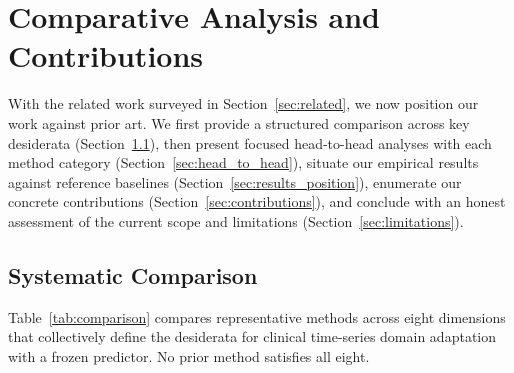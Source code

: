 
\section{Comparative Analysis and Contributions}
\label{sec:comparison}

With the related work surveyed in Section~\ref{sec:related}, we now
position our work against prior art.
We first provide a structured comparison across key desiderata
(Section~\ref{sec:comparison_table}), then present focused head-to-head analyses
with each method category (Section~\ref{sec:head_to_head}), situate our
empirical results against reference baselines (Section~\ref{sec:results_position}),
enumerate our concrete contributions (Section~\ref{sec:contributions}),
and conclude with an honest assessment of the current scope and limitations
(Section~\ref{sec:limitations}).


\subsection{Systematic Comparison}
\label{sec:comparison_table}

Table~\ref{tab:comparison} compares representative methods across eight
dimensions that collectively define the desiderata for clinical time-series
domain adaptation with a frozen predictor.
No prior method satisfies all eight.

